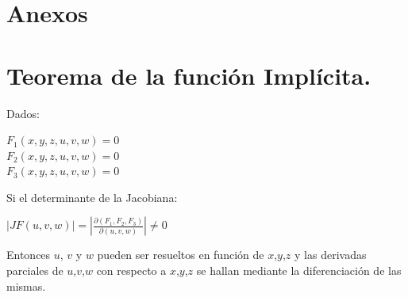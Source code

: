 \documentclass[12pt]{article}
\begin{document}
\clearpage

\section*{Anexos}
\appendix
\section{Teorema de la función Implícita.}
Dados:
\begin{center}
$F_{1}(x,y,z,u,v,w)=0$\\
$F_{2}(x,y,z,u,v,w)=0$\\
$F_{3}(x,y,z,u,v,w)=0$\\
\end{center}

Si el determinante de la Jacobiana:
\begin{center}
$|J F(u,v,w)|=|\frac{\partial(F_{1},F_{2},F_{3})}{\partial(u,v,w)}|\neq 0$\\
\end{center}
Entonces $u$, $v$ y $w$ pueden ser resueltos en función de $x$,$y$,$z$ y las derivadas parciales de $u$,$v$,$w$ con respecto a $x$,$y$,$z$ se hallan mediante la diferenciación de las mismas.
\clearpage
\end{document}

